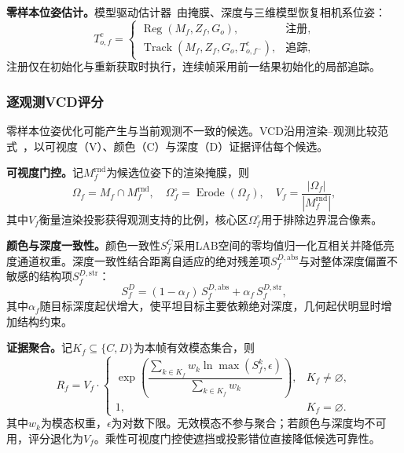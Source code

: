 \documentclass[review]{vgtc}
\begin{document}
\textbf{零样本位姿估计。}模型驱动估计器~\cite{foundationpose2024}由掩膜、深度与三维模型恢复相机系位姿：
\begin{equation}
T_{o,f}^{c} =
\begin{cases}
\operatorname{Reg}(M_f, Z_f, G_o), & \text{注册}, \\
\operatorname{Track}(M_f, Z_f, G_o, T_{o,f^-}^{c}), & \text{追踪},
\end{cases}
\label{eq:pose}
\end{equation}
注册仅在初始化与重新获取时执行，连续帧采用前一结果初始化的局部追踪。

\subsubsection{逐观测VCD评分}

零样本位姿优化可能产生与当前观测不一致的候选。VCD沿用渲染--观测比较范式~\cite{deepim2018,latentfusion2020,focalpose2022}，以可视度（V）、颜色（C）与深度（D）证据评估每个候选。

\textbf{可视度门控。}记$M_f^{\mathrm{rnd}}$为候选位姿下的渲染掩膜，则
\begin{equation}
\Omega_f = M_f \cap M_f^{\mathrm{rnd}}, \quad \Omega_f^{\circ} = \operatorname{Erode}(\Omega_f), \quad V_f = \frac{|\Omega_f|}{|M_f^{\mathrm{rnd}}|},
\label{eq:visibility}
\end{equation}
其中$V_f$衡量渲染投影获得观测支持的比例，核心区$\Omega_f^\circ$用于排除边界混合像素。

\textbf{颜色与深度一致性。}颜色一致性$S_f^C$采用LAB空间的零均值归一化互相关并降低亮度通道权重。深度一致性结合距离自适应的绝对残差项$S_f^{D,\mathrm{abs}}$与对整体深度偏置不敏感的结构项$S_f^{D,\mathrm{str}}$：
\begin{equation}
S_f^D = (1-\alpha_f)\,S_f^{D,\mathrm{abs}} + \alpha_f\,S_f^{D,\mathrm{str}},
\label{eq:depth-score}
\end{equation}
其中$\alpha_f$随目标深度起伏增大，使平坦目标主要依赖绝对深度，几何起伏明显时增加结构约束。

\textbf{证据聚合。}记$K_f\subseteq\{C,D\}$为本帧有效模态集合，则
\begin{equation}
R_f = V_f \cdot
\begin{cases}
\exp\!\left(\dfrac{\sum_{k \in K_f} w_k \ln \max(S_f^{k}, \epsilon)}{\sum_{k \in K_f} w_k}\right), & K_f \neq \varnothing, \\[6pt]
1, & K_f = \varnothing.
\end{cases}
\label{eq:vcd}
\end{equation}
其中$w_k$为模态权重，$\epsilon$为对数下限。无效模态不参与聚合；若颜色与深度均不可用，评分退化为$V_f$。乘性可视度门控使遮挡或投影错位直接降低候选可靠性。
\end{document}
